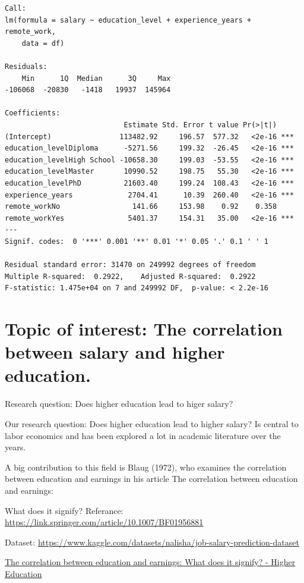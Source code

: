 \documentclass[
  letterpaper,
  DIV=11,
  numbers=noendperiod]{scrartcl}
\begin{document}
\begin{verbatim}
Call:
lm(formula = salary ~ education_level + experience_years + remote_work, 
    data = df)

Residuals:
    Min      1Q  Median      3Q     Max 
-106068  -20830   -1418   19937  145964 

Coefficients:
                            Estimate Std. Error t value Pr(>|t|)    
(Intercept)                113482.92     196.57  577.32   <2e-16 ***
education_levelDiploma      -5271.56     199.32  -26.45   <2e-16 ***
education_levelHigh School -10658.30     199.03  -53.55   <2e-16 ***
education_levelMaster       10990.52     198.75   55.30   <2e-16 ***
education_levelPhD          21603.40     199.24  108.43   <2e-16 ***
experience_years             2704.41      10.39  260.40   <2e-16 ***
remote_workNo                 141.66     153.98    0.92    0.358    
remote_workYes               5401.37     154.31   35.00   <2e-16 ***
---
Signif. codes:  0 '***' 0.001 '**' 0.01 '*' 0.05 '.' 0.1 ' ' 1

Residual standard error: 31470 on 249992 degrees of freedom
Multiple R-squared:  0.2922,    Adjusted R-squared:  0.2922 
F-statistic: 1.475e+04 on 7 and 249992 DF,  p-value: < 2.2e-16
\end{verbatim}

\section{Topic of interest: The correlation between salary and higher
education.}\label{topic-of-interest-the-correlation-between-salary-and-higher-education.}

Research question: Does higher education lead to higer salary?

Our research question: Does higher education lead to higher salary? Is
central to labor economics and has been explored a lot in academic
literature over the years.~~

A big contribution to this field is Blaug (1972), who examines the
correlation between education and earnings in his article The
correlation between education and earnings:~

What does it signify? Referance:
\url{https://link.springer.com/article/10.1007/BF01956881}

Dataset:
\url{https://www.kaggle.com/datasets/nalisha/job-salary-prediction-dataset}~

\href{https://link.springer.com/article/10.1007/BF01956881}{The
correlation between education and earnings: What does it signify? -
Higher Education}~
\end{document}
